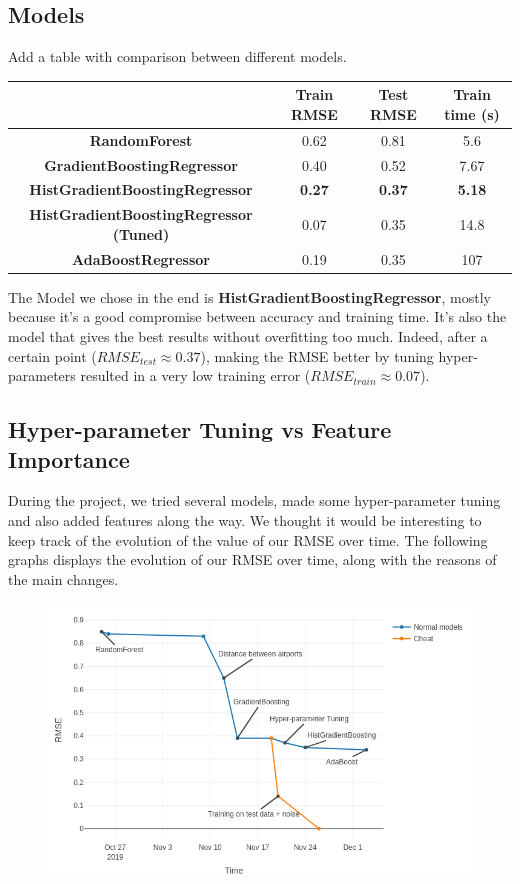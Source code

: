 \documentclass[a4paper,12pt,twoside]{article}
\begin{document}
\subsection{Models}
Add a table with comparison between different models.
\begin{center}
	\begin{tabular}{| c | c | c | c |} 
		\hline
			 & Train RMSE & Test RMSE & Train time (s) \\ [0.5ex] 
		\hline
		\textbf{RandomForest} & 0.62 & 0.81 & 5.6 \\ 
		\hline
		\textbf{GradientBoostingRegressor} & 0.40 & 0.52 & 7.67 \\
		\hline
		\textbf{HistGradientBoostingRegressor} & \textbf{0.27} & \textbf{0.37} & \textbf{5.18} \\
		\hline
		\textbf{HistGradientBoostingRegressor (Tuned)} & 0.07 & 0.35 & 14.8 \\
		\hline
		\textbf{AdaBoostRegressor} & 0.19 & 0.35 & 107 \\
		\hline
	\end{tabular}
\end{center}

The Model we chose in the end is \textbf{HistGradientBoostingRegressor}, mostly because it's a good compromise between accuracy and training time. It's also the model that gives the best results without overfitting too much. Indeed, after a certain point ($RMSE_{test} \approx 0.37$), making the RMSE better by tuning hyper-parameters resulted in a very low training error ($RMSE_{train} \approx 0.07$).


\subsection{Hyper-parameter Tuning vs Feature Importance}

During the project, we tried several models, made some hyper-parameter tuning and also added features along the way. We thought it would be interesting to keep track of the evolution of the value of our RMSE over time.
The following graphs displays the evolution of our RMSE over time, along with the reasons of the main changes.

\begin{figure}[H]
	\centering
	\includegraphics[scale=0.5]{rmse_evolution.png}
\end{figure}
\end{document}
